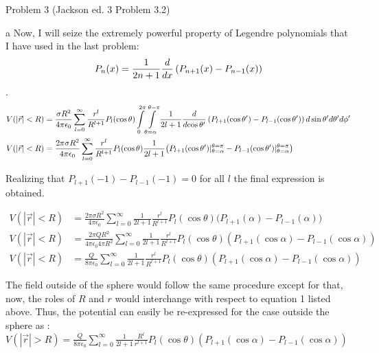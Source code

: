 \begin{homeworkProblem}{Problem 3 (Jackson ed. 3 Problem 3.2)}
\begin{homeworkSection}{a}
Now, I will seize the extremely powerful property of Legendre polynomials that I have used in the last problem: \[P_n(x) = \frac{1}{2n+1} \frac{d{}}{d{x}} \left(P_{n+1}(x)-P_{n-1}(x)\right) \].
\begin{align}
V(|\vec{r}|<R)&=\frac{\sigma  R^2 }{4\pi\epsilon_0} \sum\limits_{l=0}^{\infty} \frac{r^l}{R^{l+1}} P_l(\cos\theta) \int\limits_0^{2\pi}\int\limits_{\theta=\alpha}^{\theta = \pi} \frac{1}{2l+1} \frac{d{}}{d{\cos\theta'}} \left(P_{l+1}(\cos\theta')-P_{l-1}(\cos\theta')\right) d\sin\theta'd\theta'd\phi' \nonumber \\
V(|\vec{r}|<R)&=\frac{2\pi \sigma  R^2 }{4\pi\epsilon_0} \sum\limits_{l=0}^{\infty} \frac{r^l}{R^{l+1}} P_l(\cos\theta) \frac{1}{2l+1}\big(P_{l+1}(\cos\theta')|_{\theta=\alpha}^{\theta =\pi}-P_{l-1}(\cos\theta')|_{\theta = \alpha}^{\theta = \pi}\big) \nonumber \\
\end{align}

Realizing that $P_{l+1}(-1)-P_{l-1}(-1) = 0$ for all $l$ the final expression is obtained.

\begin{align}
V(|\vec{r}|<R)&=\frac{2\pi \sigma  R^2 }{4\pi\epsilon_0} \sum\limits_{l=0}^{\infty}\frac{1}{2l+1} \frac{r^l}{R^{l+1}} P_l(\cos\theta) \big(P_{l+1}(\alpha)-P_{l-1}(\alpha)\big) \nonumber \\
V(|\vec{r}|<R)&=\frac{2\pi Q R^2}{4 \pi \epsilon_0 4\pi R^2} \sum\limits_{l=0}^{\infty}\frac{1}{2l+1} \frac{r^l}{R^{l+1}} P_l(\cos\theta) \left(P_{l+1}(\cos\alpha)-P_{l-1}(\cos\alpha)\right) \nonumber \\
V(|\vec{r}|<R)&=\frac{Q }{8 \pi \epsilon_0} \sum\limits_{l=0}^{\infty}\frac{1}{2l+1} \frac{r^l}{R^{l+1}} P_l(\cos\theta) \left(P_{l+1}(\cos\alpha)-P_{l-1}(\cos\alpha)\right) \nonumber
\end{align}


The field outside of the sphere would follow the same procedure except for that, now, the roles of $R$ and $r$ would interchange with respect to equation 1 listed above. Thus, the potential can easily be re-expressed for the case outside the sphere as : $V(|\vec{r}|>R) =\frac{Q }{8 \pi \epsilon_0} \sum\limits_{l=0}^{\infty}\frac{1}{2l+1} \frac{R^l}{r^{l+1}} P_l(\cos\theta) \left(P_{l+1}(\cos\alpha)-P_{l-1}(\cos\alpha)\right)$
\end{homeworkSection}


\end{homeworkProblem}
